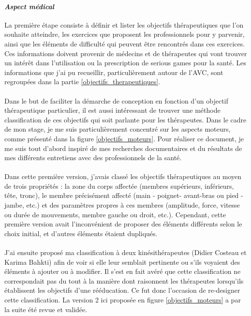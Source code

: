 			\paragraph{\emph{Aspect médical}\\}
La première étape consiste à définir et lister les objectifs thérapeutiques que l’on souhaite atteindre, les exercices que proposent les professionnels pour y parvenir, ainsi que les éléments de difficulté qui peuvent être rencontrés dans ces exercices. Ces informations doivent provenir de médecins et de thérapeutes qui vont trouver un intérêt dans l’utilisation ou la prescription de serious games pour la santé. Les informations que j'ai pu recueillir, particulièrement autour de l'AVC, sont regroupées dans la partie \ref{objectifs_therapeutiques}.

\paragraph{}
Dans le but de faciliter la démarche de conception en fonction d’un objectif thérapeutique particulier, il est aussi intéressant de trouver une méthode classification de ces objectifs qui soit parlante pour les thérapeutes. Dans le cadre de mon stage, je me suis particulièrement concentré sur les aspects moteurs, comme présenté dans la figure \ref{objectifs_moteurs}. Pour réaliser ce document, je me suis tout d'abord inspiré de mes recherches documentaires et du résultats de mes différents entretiens avec des professionnels de la santé.

\paragraph{}
Dans cette première version, j'avais classé les objectifs thérapeutiques au moyen de trois propriétés : la zone du corps affectée (membres supérieurs, inférieurs, tête, tronc), le membre précisément affecté (main - poignet- avant-bras ou pied - jambe, etc.) et des paramètres propres à ces membres (amplitude, force, vitesse ou durée de mouvements, membre gauche ou droit, etc.). Cependant, cette première version avait l'inconvénient de proposer des éléments différents selon le choix initial, et d'autres éléments étaient dupliqués.

\paragraph{}J'ai ensuite proposé ma classification à deux kinésithérapeutes (Didier Costeau et Karima Bahkti) afin de voir si elle leur semblait pertinente ou s'ils voyaient des éléments à ajouter ou à modifier. Il s'est en fait avéré que cette classification ne correspondait pas du tout à la manière dont raisonnent les thérapeutes lorsqu'ils établissent les objectifs d'une rééducation. Ce fut donc l'occasion de re-designer cette classification. La version 2 ici proposée en figure \ref{objectifs_moteurs} a par la suite été revue et validée.

